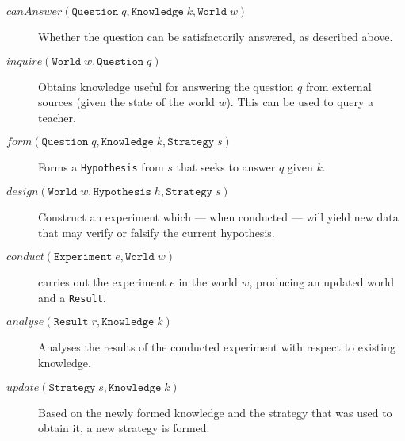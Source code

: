 \documentclass[../Master.tex]{subfiles}
\begin{document}
\begin{description}
    \item[$canAnswer( \texttt{Question} \; q
                    , \texttt{Knowledge} \; k
                    , \texttt{World} \; w
                    )
         $]
        Whether the question can be satisfactorily answered, as described above.

    \item[$inquire( \texttt{World} \; w
                  , \texttt{Question} \; q
                  )
         $]
        Obtains knowledge useful for answering the question $q$ from external sources (given the state of the world $w$). This can be used to query a teacher.

    \item[$form( \texttt{Question} \; q
               , \texttt{Knowledge} \; k
               , \texttt{Strategy} \; s
               )
         $]
        Forms a \texttt{Hypothesis} from $s$ that seeks to answer $q$ given $k$.

    \item[$design( \texttt{World} \; w
                 , \texttt{Hypothesis} \; h
                 , \texttt{Strategy} \; s
                 )
         $]
        Construct an experiment which --- when conducted --- will yield new data that may verify or falsify the current hypothesis.

    \item[$conduct( \texttt{Experiment} \; e
                  , \texttt{World} \; w
                  )
         $]
        carries out the experiment $e$ in the world $w$, producing an updated world and a \texttt{Result}.

    \item[$analyse( \texttt{Result} \; r
                  , \texttt{Knowledge} \; k
                  )
         $]
        Analyses the results of the conducted experiment with respect to existing knowledge.

    \item[$update( \texttt{Strategy} \; s
                 , \texttt{Knowledge} \; k
                 )
         $]
        Based on the newly formed knowledge and the strategy that was used to obtain it, a new strategy is formed.
\end{description}
\end{document}
